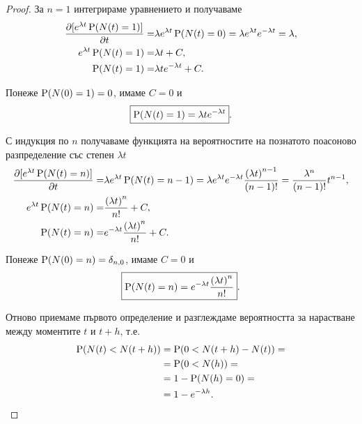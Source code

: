 \documentclass{../../common/topic}
\begin{document}
\begin{proof}
  За \( n = 1 \) интегрираме уравнението и получаваме
  \begin{align*}
    \frac {\partial [e^{\lambda t} \operatorname{P}(N(t) = 1)]} {\partial t}
    =&
    \lambda e^{\lambda t} \operatorname{P}(N(t) = 0)
    =
    \lambda e^{\lambda t} e^{-\lambda t}
    =
    \lambda,
    \\
    e^{\lambda t} \operatorname{P}(N(t) = 1)
    =&
    \lambda t + C,
    \\
    \operatorname{P}(N(t) = 1)
    =&
    \lambda t e^{-\lambda t} + C.
  \end{align*}

  Понеже \( \operatorname{P}(N(0) = 1) = 0 \), имаме \( C = 0 \) и
  \begin{equation*}
    \boxed{\operatorname{P}(N(t) = 1) = \lambda t e^{-\lambda t}}.
  \end{equation*}

  С индукция по \( n \) получаваме функцията на вероятностите на познатото поасоново разпределение със степен \( \lambda t \)
  \begin{align*}
    \frac {\partial [e^{\lambda t} \operatorname{P}(N(t) = n)]} {\partial t}
    =&
    \lambda e^{\lambda t} \operatorname{P}(N(t) = n - 1)
    =
    \lambda e^{\lambda t} e^{-\lambda t} \frac {{(\lambda t)}^{n-1}} {(n-1)!}
    =
    \frac {\lambda^n} {(n-1)!} t^{n-1},
    \\
    e^{\lambda t} \operatorname{P}(N(t) = n)
    =&
    \frac {{(\lambda t)}^n} {n!} + C,
    \\
    \operatorname{P}(N(t) = n)
    =&
    e^{-\lambda t} \frac {{(\lambda t)}^n} {n!} + C.
  \end{align*}

  Понеже \( \operatorname{P}(N(0) = n) = \delta_{n,0} \), имаме \( C = 0 \) и
  \begin{equation*}
    \boxed{\operatorname{P}(N(t) = n) = e^{-\lambda t} \frac {{(\lambda t)}^n} {n!}}.
  \end{equation*}

   Отново приемаме първото определение и разглеждаме вероятността за нарастване между моментите \( t \) и \( t+h \), т.е.
  \begin{align*}
    \operatorname{P}(N(t) < N(t+h))
    &=
    \operatorname{P}(0 < N(t+h) - N(t))
    = \\ &=
    \operatorname{P}(0 < N(h))
    = \\ &=
    1 - \operatorname{P}(N(h) = 0)
    = \\ &=
    1 - e^{-\lambda h}.
  \end{align*}


\end{proof}
\end{document}
